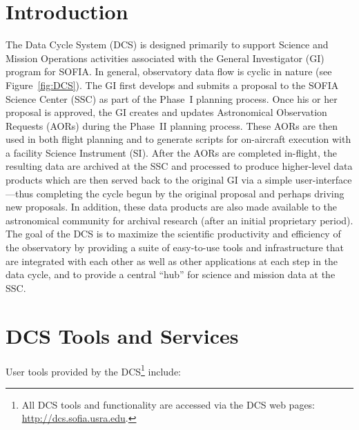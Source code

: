 \section{Introduction}

The Data Cycle System (DCS) is designed primarily to support Science and Mission Operations activities associated with the General Investigator (GI) program for SOFIA. In general, observatory data flow is cyclic in nature (see Figure~\ref{fig:DCS}).  The GI first develops and submits a proposal to the SOFIA Science Center (SSC) as part of the Phase~I planning process. Once his or her proposal is approved, the GI creates and updates Astronomical Observation Requests (AORs) during the Phase~II planning process. These AORs are then used in both flight planning and to generate scripts for on-aircraft execution with a facility Science Instrument (SI). After the AORs are completed in-flight, the resulting data are archived at the SSC and processed to produce higher-level data products which are then served back to the original GI via a simple user-interface---thus completing the cycle begun by the original proposal and perhaps driving new proposals. In addition, these data products are also made available to the astronomical community for archival research (after an initial proprietary period).  The goal of the DCS is to maximize the scientific productivity and efficiency of the observatory by providing a suite of easy-to-use tools and infrastructure that are integrated with each other as well as other applications at each step in the data cycle, and to provide a central ``hub'' for science and mission data at the SSC.



\section{DCS Tools and Services}

User tools provided by the DCS\footnote{All DCS tools and functionality are accessed via the DCS web pages:  \url{http://dcs.sofia.usra.edu}. } 
include:


